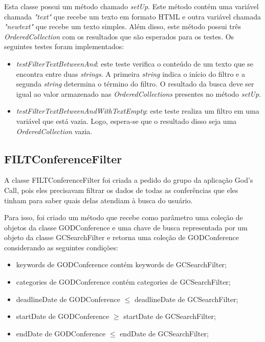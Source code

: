 Esta classe possui um método chamado \textit{setUp}. Este método contém uma variável chamada \textit{"text"} que recebe um texto em formato HTML e outra variável chamada \textit{"newtext"} que recebe um texto simples. Além disso, este método possui três \textit{OrderedCollection} com os resultados que são esperados para os testes. Os seguintes testes foram implementados:

\begin{itemize}
\item \textit{testFilterTextBetweenAnd}: este teste verifica o conteúdo de um texto que se encontra entre duas \textit{strings}. A primeira \textit{string} indica o início do filtro e a segunda \textit{string} determina o término do filtro. O resultado da busca deve ser igual ao valor armazenado nas \textit{OrderedCollections} presentes no método \textit{setUp}. 
\item \textit{testFilterTextBetweenAndWithTextEmpty}: este teste realiza um filtro em uma variável que está vazia. Logo, espera-se que o resultado disso seja uma \textit{OrderedCollection} vazia. 
\end{itemize}

\subsection{FILTConferenceFilter}

A classe FILTConferenceFilter foi criada a pedido do grupo da aplicação God's Call, pois eles precisavam filtrar os dados de todas as conferências que eles tinham para saber quais delas atendiam à busca do usuário.

Para isso, foi criado um método que recebe como parâmetro uma coleção de objetos da classe GODConference e uma chave de busca representada por um objeto da classe GCSearchFilter e retorna uma coleção de GODConference considerando as seguintes condições:
\begin{itemize}
\item keywords de GODConference contém keywords de GCSearchFilter;
\item categories de GODConference contém categories de GCSearchFilter;
\item deadlineDate de GODConference $ \le $ deadlineDate de GCSearchFilter;
\item startDate de GODConference $ \ge $ startDate de GCSearchFilter;
\item endDate de GODConference $ \le $ endDate de GCSearchFilter;
\end{itemize}

